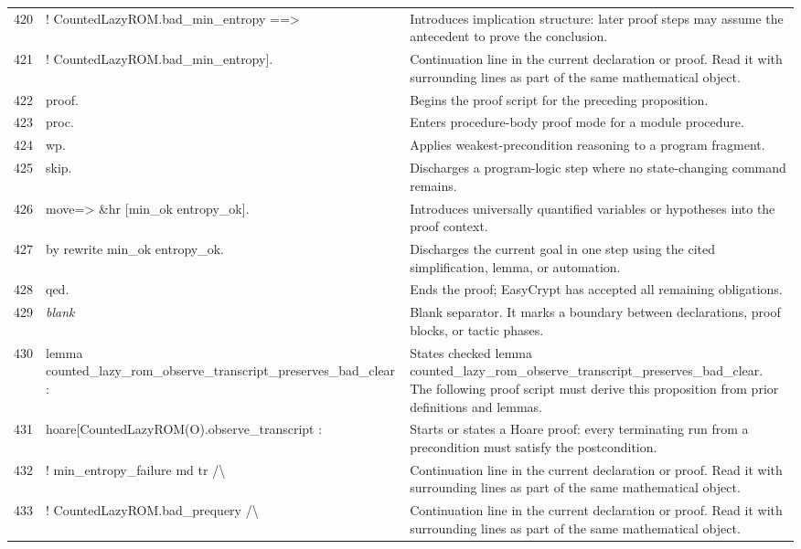 \documentclass[10pt]{article}
\begin{document}
\begin{longtable}{r L{0.53\textwidth} L{0.37\textwidth}}
420 & {\ttfamily\scriptsize     ! CountedLazyROM.bad\_min\_entropy ==>} & Introduces implication structure: later proof steps may assume the antecedent to prove the conclusion. \\
421 & {\ttfamily\scriptsize     ! CountedLazyROM.bad\_min\_entropy].} & Continuation line in the current declaration or proof.  Read it with surrounding lines as part of the same mathematical object. \\
422 & {\ttfamily\scriptsize proof.} & Begins the proof script for the preceding proposition. \\
423 & {\ttfamily\scriptsize proc.} & Enters procedure-body proof mode for a module procedure. \\
424 & {\ttfamily\scriptsize wp.} & Applies weakest-precondition reasoning to a program fragment. \\
425 & {\ttfamily\scriptsize skip.} & Discharges a program-logic step where no state-changing command remains. \\
426 & {\ttfamily\scriptsize move=> \&hr [min\_ok entropy\_ok].} & Introduces universally quantified variables or hypotheses into the proof context. \\
427 & {\ttfamily\scriptsize by rewrite min\_ok entropy\_ok.} & Discharges the current goal in one step using the cited simplification, lemma, or automation. \\
428 & {\ttfamily\scriptsize qed.} & Ends the proof; EasyCrypt has accepted all remaining obligations. \\
429 & {\ttfamily\scriptsize \emph{blank}} & Blank separator.  It marks a boundary between declarations, proof blocks, or tactic phases. \\
430 & {\ttfamily\scriptsize lemma counted\_lazy\_rom\_observe\_transcript\_preserves\_bad\_clear :} & States checked lemma counted\_lazy\_rom\_observe\_transcript\_preserves\_bad\_clear.  The following proof script must derive this proposition from prior definitions and lemmas. \\
431 & {\ttfamily\scriptsize   hoare[CountedLazyROM(O).observe\_transcript :} & Starts or states a Hoare proof: every terminating run from a precondition must satisfy the postcondition. \\
432 & {\ttfamily\scriptsize     ! min\_entropy\_failure md tr /\textbackslash{}} & Continuation line in the current declaration or proof.  Read it with surrounding lines as part of the same mathematical object. \\
433 & {\ttfamily\scriptsize     ! CountedLazyROM.bad\_prequery /\textbackslash{}} & Continuation line in the current declaration or proof.  Read it with surrounding lines as part of the same mathematical object. \\

\end{longtable}
\end{document}
